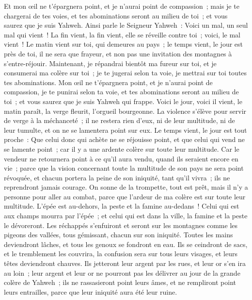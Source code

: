 \begin{multicols}{2}
Et mon œil ne t'épargnera point, et je n'aurai point de compassion~; mais je te chargerai de tes voies, et tes abominations seront au milieu de toi~; et vous saurez que je suis Yahweh.
Ainsi parle le Seigneur Yahweh~: Voici un mal, un seul mal qui vient~!
La fin vient, la fin vient, elle se réveille contre toi~; voici, le mal vient~!
Le matin vient sur toi, qui demeures au pays~; le temps vient, le jour est près de toi, il ne sera que frayeur, et non pas une invitation des montagnes à s'entre-réjouir.
Maintenant, je répandrai bientôt ma fureur sur toi, et je consumerai ma colère sur toi~; je te jugerai selon ta voie, je mettrai sur toi toutes tes abominations.
Mon œil ne t'épargnera point, et je n'aurai point de compassion, je te punirai selon ta voie, et tes abominations seront au milieu de toi~; et vous saurez que je suis Yahweh qui frappe.
Voici le jour, voici il vient, le matin paraît, la verge fleurit, l'orgueil bourgeonne.
La violence s'élève pour servir de verge à la méchanceté~; il ne restera rien d'eux, ni de leur multitude, ni de leur tumulte, et on ne se lamentera point sur eux.
Le temps vient, le jour est tout proche~: Que celui donc qui achète ne se réjouisse point, et que celui qui vend ne se lamente point~; car il y a une ardente colère sur toute leur multitude.
Car le vendeur ne retournera point à ce qu'il aura vendu, quand ils seraient encore en vie~; parce que la vision concernant toute la multitude de son pays ne sera point révoquée, et chacun portera la peine de son iniquité, tant qu'il vivra~; ils ne reprendront jamais courage.
On sonne de la trompette, tout est prêt, mais il n'y a personne pour aller au combat, parce que l'ardeur de ma colère est sur toute leur multitude.
L'épée est au-dehors, la peste et la famine au-dedans~! Celui qui est aux champs mourra par l'épée~; et celui qui est dans la ville, la famine et la peste le dévoreront.
Les réchappés s'enfuiront et seront sur les montagnes comme les pigeons des vallées, tous gémissant, chacun sur son iniquité.
Toutes les mains deviendront lâches, et tous les genoux se fondront en eau.
Ils se ceindront de sacs, et le tremblement les couvrira, la confusion sera sur tous leurs visages, et leurs têtes deviendront chauves.
Ils jetteront leur argent par les rues, et leur or s'en ira au loin~; leur argent et leur or ne pourront pas les délivrer au jour de la grande colère de Yahweh~; ils ne rassasieront point leurs âmes, et ne rempliront point leurs entrailles, parce que leur iniquité aura été leur ruine.

\end{multicols}
